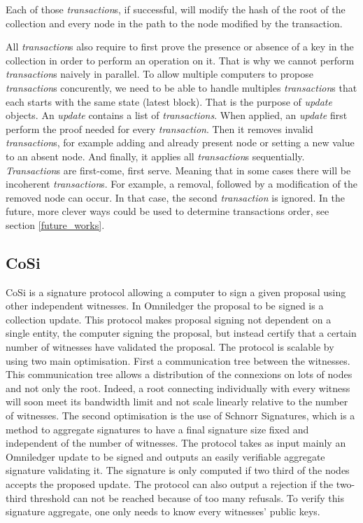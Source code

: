\documentclass[11pt, a4paper, twoside, openright]{article}
\begin{document}
Each of those \textit{transaction}s, if successful, will modify the hash of the root of the collection and every node in the path to the node modified by the transaction.

All \textit{transaction}s also require to first prove the presence or absence of a key in the collection in order to perform an operation on it. That is why we cannot perform \textit{transaction}s naively in parallel. To allow multiple computers to propose \textit{transaction}s concurently, we need to be able to handle multiples \textit{transaction}s that each starts with the same state (latest block). That is the purpose of \textit{update} objects. An \textit{update} contains a list of \textit{transactions}. When applied, an \textit{update} first perform the proof needed for every \textit{transaction}. Then it removes invalid \textit{transaction}s, for example adding and already present node or setting a new value to an absent node. And finally, it applies all \textit{transaction}s sequentially. \textit{Transaction}s are first-come, first serve. Meaning that in some cases there will be incoherent \textit{transaction}s. For example, a removal, followed by a modification of the removed node can occur. In that case, the second \textit{transaction} is ignored. In the future, more clever ways could be used to determine transactions order, see section \ref{future_works}.

\subsection{CoSi}
CoSi\cite{CoSi} is a signature protocol allowing a computer to sign a given proposal using other independent witnesses. In Omniledger the proposal to be signed is a collection update. This protocol makes proposal signing not dependent on a single entity, the computer signing the proposal, but instead certify that a certain number of witnesses have validated the proposal. The protocol is scalable by using two main optimisation. First a communication tree between the witnesses. This communication tree allows a distribution of the connexions on lots of nodes and not only the root. Indeed, a root connecting individually with every witness will soon meet its bandwidth limit and not scale linearly relative to the number of witnesses. The second optimisation is the use of Schnorr Signatures\cite{Schnorr}, which is a method to aggregate signatures to have a final signature size fixed and independent of the number of witnesses. The protocol takes as input mainly an Omniledger update to be signed and outputs an easily verifiable aggregate signature validating it. The signature is only computed if two third of the nodes accepts the proposed update. The protocol can also output a rejection if the two-third threshold can not be reached because of too many refusals. To verify this signature aggregate, one only needs to know every witnesses' public keys.
\end{document}
